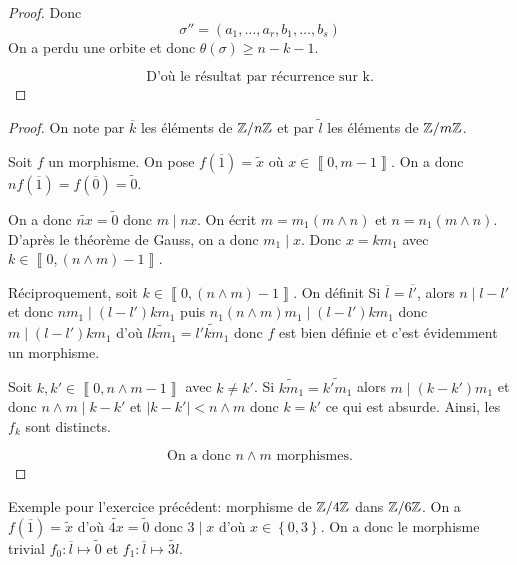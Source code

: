 \begin{proof}
	Donc 
	\begin{equation}
		\sigma''=(a_{1},\dots,a_{r},b_{1},\dots,b_{s})
	\end{equation}
	On a perdu une orbite et donc $\theta(\sigma)\geqslant n-k-1$. 
	
	\begin{equation}
		\boxed{\text{D'où le résultat par récurrence sur k.}}
	\end{equation}
\end{proof}

\begin{proof}
	On note par $\overline{k}$ les éléments de $\mathbb{Z}/n\mathbb{Z}$ et par $\widetilde{l}$ les éléments de $\mathbb{Z}/m\mathbb{Z}$.

	Soit $f$ un morphisme. On pose $f(\overline{1})=\widetilde{x}$ où $x\in\left\llbracket 0,m-1\right\rrbracket$. On a donc $nf(\overline{1})=f(\overline{0})=\widetilde{0}$.

	On a donc $\widetilde{nx}=\widetilde{0}$ donc $m\mid nx$. On écrit $m=m_{1}(m\wedge n)$ et $n=n_{1}(m\wedge n)$. D'après le théorème de Gauss, on a donc $m_{1}\mid x$. Donc $x=km_{1}$ avec $k\in\left\llbracket 0,(n\wedge m)-1\right\rrbracket$.

	Réciproquement, soit $k\in\left\llbracket 0,(n\wedge m)-1\right\rrbracket$. On définit 
	Si $\overline{l}=\overline{l'}$, alors $n\mid l-l'$ et donc $nm_{1}\mid (l-l')km_{1}$ puis $n_{1}(n\wedge m)m_{1}\mid (l-l')km_{1}$ donc $m\mid (l-l')km_{1}$ d'où $\widetilde{lkm_{1}}=\widetilde{l'km_{1}}$ donc $f$ est bien définie et c'est évidemment un morphisme. 
	
	Soit $k,k'\in\left\llbracket 0,n\wedge m-1\right\rrbracket$ avec $k\neq k'$. Si $\widetilde{km_{1}}=\widetilde{k'm_{1}}$ alors $m\mid (k-k')m_{1}$ et donc $n\wedge m\mid k-k'$ et $\vert k-k'\vert< n\wedge m$ donc $k=k'$ ce qui est absurde. Ainsi, les $f_{k}$ sont distincts. 
	
	\begin{equation}
		\boxed{\text{On a donc }n\wedge m\text{ morphismes.}}
	\end{equation}
\end{proof}

\begin{remark}
	Exemple pour l'exercice précédent: morphisme de $\mathbb{Z}/4\mathbb{Z}$ dans $\mathbb{Z}/6\mathbb{Z}$. On a $f(\overline{1})=\widetilde{x}$ d'où $\widetilde{4x}=\widetilde{0}$ donc $3\mid x$ d'où $x\in\left\{0,3\right\}$. On a donc le morphisme trivial $f_{0}\colon \overline{l}\mapsto\widetilde{0}$ et $f_{1}\colon\overline{l}\mapsto\widetilde{3l}$.
\end{remark}

